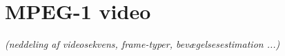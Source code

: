 \newpage
\section{MPEG-1 video}
\textit{(neddeling af videosekvens, frame-typer, bevægelsesestimation ...)}
